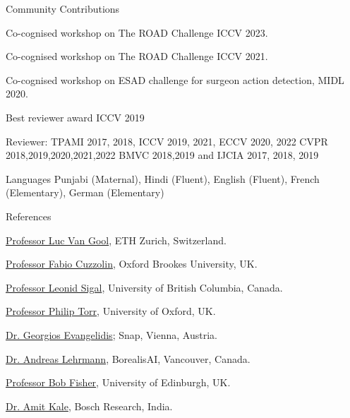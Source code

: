 \documentclass{resume_long} %
\begin{document}
\clearpage

\vspace{0.1in}
\begin{rSection}{Community Contributions}{} \itemsep -2pt
    \item Co-cognised workshop on The ROAD Challenge ICCV 2023.
    \item Co-cognised workshop on The ROAD Challenge ICCV 2021.
    \item Co-cognised workshop on ESAD challenge for surgeon action detection, MIDL 2020.
    \item Best reviewer award ICCV 2019
    \item Reviewer: TPAMI 2017, 2018, ICCV 2019, 2021, ECCV 2020, 2022 CVPR 2018,2019,2020,2021,2022 BMVC 2018,2019 and IJCIA 2017, 2018, 2019
\end{rSection}


\vspace{0.1in}
\begin{rSection}{Languages}{}  \itemsep -2pt
  Punjabi (Maternal), Hindi (Fluent), English (Fluent), French (Elementary), German (Elementary)
\end{rSection}

\vspace{0.1in}
\begin{rSection}{References}{}  \itemsep -2pt
\item \href{https://ee.ethz.ch/the-department/faculty/professors/person-detail.OTAyMzM=.TGlzdC80MTEsMTA1ODA0MjU5.html}{Professor Luc Van Gool}, ETH Zurich, Switzerland.
\item \href{http://cms.brookes.ac.uk/staff/FabioCuzzolin/}{Professor Fabio Cuzzolin}, Oxford Brookes University, UK.
\item \href{https://www.cs.ubc.ca/~lsigal/}{Professor Leonid Sigal}, University of British Columbia, Canada.
\item \href{http://www.robots.ox.ac.uk/~phst/}{Professor Philip Torr}, University of Oxford, UK.
\item \href{https://team.inria.fr/perception/team-members/evangelidis/}{Dr. Georgios Evangelidis}; Snap, Vienna, Austria.
\item \href{https://ps.is.tuebingen.mpg.de/person/alehrmann}{Dr. Andreas Lehrmann}, BorealisAI, Vancouver, Canada.
\item \href{http://homepages.inf.ed.ac.uk/rbf/}{Professor Bob Fisher}, University of Edinburgh, UK.
\item \href{http://www.cfar.umd.edu/~kale/}{Dr. Amit Kale}, Bosch Research, India.
\end{rSection}
\end{document}
